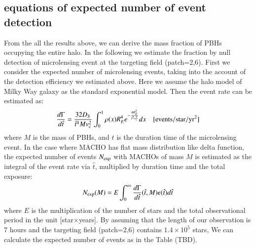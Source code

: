 \documentclass[iop, apj]{emulateapj}
\newcommand{\?}{\stackrel{?}{=}}
\begin{document}
\subsection{equations of expected number of event detection} %
\label{sec:constraint}
From the all the results above, 
we can derive the mass fraction of PBHs occupying the entire halo. 
In the following we estimate the fraction by null detection of microlensing event at the targeting field (patch=2,6). 
First we consider the expected number of microlensing events, taking into 
the account of the detection efficiency we estimated above.
Here we assume the halo model of Milky Way galaxy as the standard exponential model. %
Then the event rate can be estimated as:
%
\begin{eqnarray}
\frac{d\Gamma}{d\hat t}=\frac{32D_S}{\hat t^4 Mv_c^2}\int^1_0 \rho(x) R^4_E e^{-\frac{4R^2_E}{\hat t^2 v^2_c}} dx \quad[\rm {events/star/yr^2}]\nonumber
\end{eqnarray}
%
where $M$ is the mass of PBHs, and $\hat t$ is the duration time of the microlensing event. 
%
%
In the case where MACHO has flat mass distribution like delta function, 
the expected number of events $N_{\rm exp}$ with MACHOs of mass $M$ is estimated as
the integral of the event rate via $\hat t$, 
multiplied by duration time and the total exposure:
%
\begin{eqnarray}
N_{\rm exp}(M)=E\int^{\infty}_0 \frac{d\Gamma}{d\hat t}(\hat t,M)\epsilon(\hat t)d\hat t
\end{eqnarray}
%
where $E$ is the multiplication of the number of stars and the total observational period in the unit [star$\times$years]. 
By assuming that the length of our observation is $7$ hours and the targeting field (patch=2,6) contains $1.4\times10^5$ stars, 
We can calculate the expected number of events as in the Table (TBD). %
\end{document}
